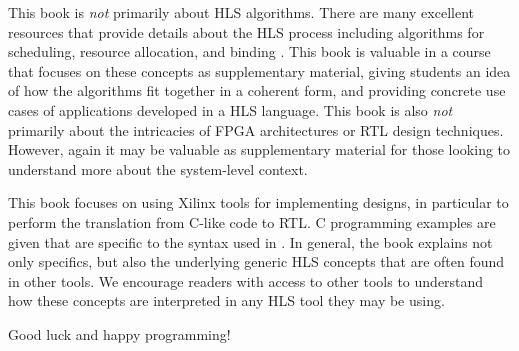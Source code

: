 This book is {\em not} primarily about HLS algorithms.  There are many excellent resources that provide details about the HLS process including algorithms for scheduling, resource allocation, and binding \cite{micheli1994synthesis, gupta2004spark, coussy2010high, gajski2012high}.  This book is valuable in a course that focuses on these concepts as supplementary material, giving students an idea of how the algorithms fit together in a coherent form, and providing concrete use cases of applications developed in a HLS language.  This book is also {\em not} primarily about the intricacies of FPGA architectures or RTL design techniques.  However, again it may be valuable as supplementary material for those looking to understand more about the system-level context.

This book focuses on using Xilinx tools for implementing designs, in particular \VHLS to perform the translation from C-like code to RTL.  C programming examples are given that are specific to the syntax used in \VHLS.  In general, the book explains not only \VHLS specifics, but also the underlying generic HLS concepts that are often found in other tools.  We encourage readers with access to other tools to understand how these concepts are interpreted in any HLS tool they may be using.

Good luck and happy programming!